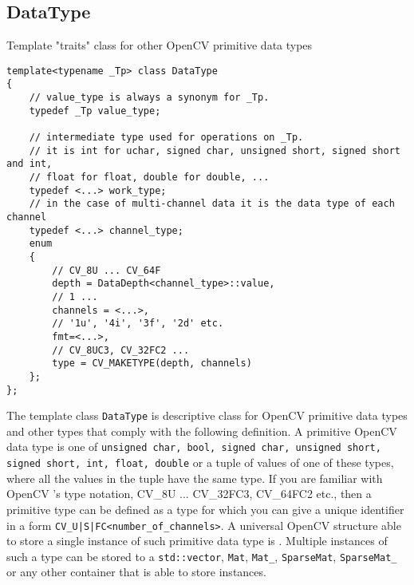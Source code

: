 \fi


\ifCpp
\subsection{DataType}\label{DataType}
Template "traits" class for other OpenCV primitive data types

\begin{lstlisting}
template<typename _Tp> class DataType
{
    // value_type is always a synonym for _Tp.
    typedef _Tp value_type;
    
    // intermediate type used for operations on _Tp.
    // it is int for uchar, signed char, unsigned short, signed short and int,
    // float for float, double for double, ...
    typedef <...> work_type;
    // in the case of multi-channel data it is the data type of each channel
    typedef <...> channel_type;
    enum
    {
        // CV_8U ... CV_64F
        depth = DataDepth<channel_type>::value,
        // 1 ... 
        channels = <...>,
        // '1u', '4i', '3f', '2d' etc.
        fmt=<...>,
        // CV_8UC3, CV_32FC2 ...
        type = CV_MAKETYPE(depth, channels)
    };
};
\end{lstlisting}

The template class \texttt{DataType} is descriptive class for OpenCV primitive data types and other types that comply with the following definition. A primitive OpenCV data type is one of \texttt{unsigned char, bool, signed char, unsigned short, signed short, int, float, double} or a tuple of values of one of these types, where all the values in the tuple have the same type. If you are familiar with OpenCV 's type notation, CV\_8U ... CV\_32FC3, CV\_64FC2 etc., then a primitive type can be defined as a type for which you can give a unique identifier in a form \texttt{CV\_<bit-depth>{U|S|F}C<number\_of\_channels>}. A universal OpenCV structure able to store a single instance of such primitive data type is . Multiple instances of such a type can be stored to a \texttt{std::vector}, \texttt{Mat}, \texttt{Mat\_}, \texttt{SparseMat}, \texttt{SparseMat\_} or any other container that is able to store  instances.
 
